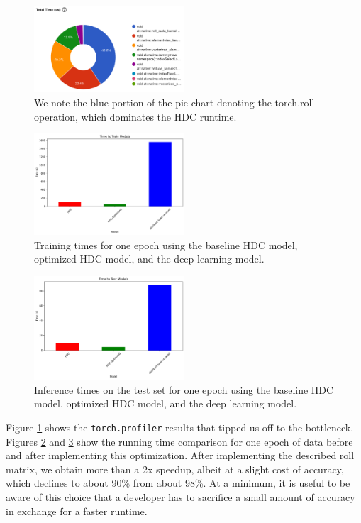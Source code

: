 \documentclass[conference]{IEEEtran}
\begin{document}
\begin{figure}[htbp]
    \centering
    \includegraphics[width=0.5\textwidth]{./analysis/torch_roll.png}
    \caption{We note the blue portion of the pie chart denoting the torch.roll operation, which dominates the HDC runtime.}
    \label{fig:roll}
\end{figure}

\begin{figure}[htbp]
    \centering
    \includegraphics[width=0.5\textwidth]{./analysis/speed_train.png}
    \caption{Training times for one epoch using the baseline HDC model, optimized HDC model, and the deep learning model.}
    \label{fig:speed_train}
\end{figure}

\begin{figure}[htbp]
    \centering
    \includegraphics[width=0.5\textwidth]{./analysis/speed_test.png}
    \caption{Inference times on the test set for one epoch using the baseline HDC model, optimized HDC model, and the deep learning model.}
    \label{fig:speed_test}
\end{figure}

Figure \ref{fig:roll} shows the \verb|torch.profiler| results that tipped us off to the bottleneck. Figures \ref{fig:speed_train} and \ref{fig:speed_test} show the running time comparison for one epoch of data before and after implementing this optimization. After implementing the described roll matrix, we obtain more than a 2x speedup, albeit at a slight cost of accuracy, which declines to about 90\% from about 98\%. At a minimum, it is useful to be aware of this choice that a developer has to sacrifice a small amount of accuracy in exchange for a faster runtime.
\end{document}
